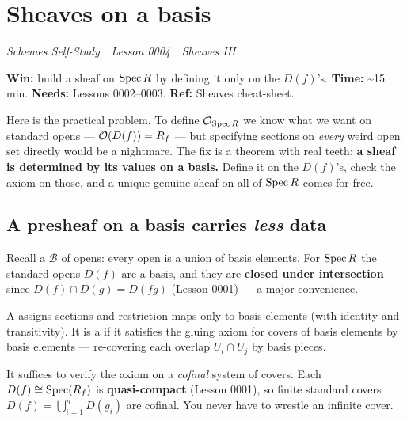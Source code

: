 \chapter{Sheaves on a basis}\label{ch:ch04-basis}

\noindent\textit{Schemes Self-Study \,\textperiodcentered\, Lesson 0004 \,\textperiodcentered\, Sheaves III}

\begin{primarybox}
\textbf{Win:} build a sheaf on $\operatorname{Spec} R$ by defining it only on the $D(f)$'s.\quad
\textbf{Time:} \textasciitilde15 min.\quad
\textbf{Needs:} Lessons 0002--0003.\quad
\textbf{Ref:} Sheaves cheat-sheet.
\end{primarybox}

\noindent Here is the practical problem. To define $\mathcal{O}_{\operatorname{Spec} R}$ we know what we want on standard
opens --- $\mathcal{O}(D(f))=R_f$ --- but specifying sections on \emph{every} weird open set directly would be a
nightmare. The fix is a theorem with real teeth: \textbf{a sheaf is determined by its values on a
basis.} Define it on the $D(f)$'s, check the axiom on those, and a unique genuine sheaf on all of
$\operatorname{Spec} R$ comes for free.

\section{A presheaf on a basis carries \emph{less} data}

Recall a  $\mathcal B$ of opens: every open is a union of basis elements. For $\operatorname{Spec} R$
the standard opens $D(f)$ are a basis, and they are \textbf{closed under intersection} since
$D(f)\cap D(g)=D(fg)$ (Lesson 0001) --- a major convenience.

\begin{defbox}
A  assigns sections and restriction maps only to basis elements (with
identity and transitivity). It is a  if it satisfies the gluing axiom for covers of basis elements by basis elements ---
re-covering each overlap $U_i\cap U_j$ by basis pieces.
\end{defbox}

\begin{warnbox}
It suffices to verify the axiom on a \emph{cofinal} system of covers. Each $D(f)\cong\operatorname{Spec}(R_f)$ is \textbf{quasi-compact} (Lesson 0001), so finite standard
covers $D(f)=\bigcup_{i=1}^{n} D(g_i)$ are cofinal. You never have to wrestle an infinite cover.
\end{warnbox}

